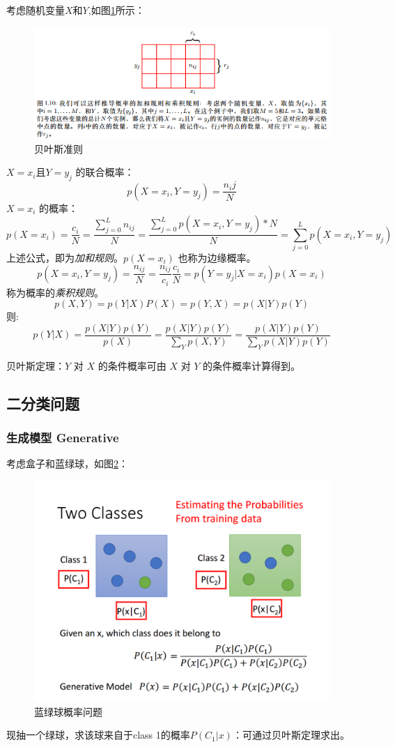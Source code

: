 考虑随机变量$X$和$Y$,如图\ref{fig:Bayesian lawl}所示：
\begin{figure}[ht]
	\centering
	\includegraphics[scale=0.5]{pic/gailv}
	\caption{贝叶斯准则}
	\label{fig:Bayesian lawl}
\end{figure}
$X=x_i$且$Y=y_j$ 的联合概率：
\[
p(X=x_i,Y=y_j)=\frac{n_ij}{N}
\]
$X=x_i$ 的概率：
\[
p(X=x_i)=\frac{c_i}{N}=\frac{\sum_{j=0}^L n_{ij}}{N}=\frac{\sum_{j=0}^L p(X=x_i,Y=y_j)*N}{N}=\sum_{j=0}^L p(X=x_i,Y=y_j)
\]
上述公式，即为\emph{加和规则}。$p(X=x_i)$ 也称为边缘概率。
\[
p(X=x_i,Y=y_j)=\frac{n_{ij}}{N}=\frac{n_{ij}}{c_i} \frac{c_i}{N}=p(Y=y_j|X=x_i)p(X=x_i)
\]
称为概率的\emph{乘积规则}。
\[
p(X,Y)=p(Y|X)P(X)=p(Y,X)=p(X|Y)p(Y)
\]
则:
\begin{equation}
p(Y|X)=\frac{p(X|Y)p(Y)}{p(X)}=\frac{p(X|Y)p(Y)}{\sum_Y{p(X,Y)}}=\frac{p(X|Y)p(Y)}{\sum_Y{p(X|Y)p(Y)}}
\end{equation}

贝叶斯定理：$Y$ 对 $X$ 的条件概率可由 $X$ 对 $Y$ 的条件概率计算得到。

\subsection{二分类问题}

\subsubsection{生成模型 Generative}

考虑盒子和蓝绿球，如图\ref{fig:green_blue_ball}：
\begin{figure}[ht]
	\centering
	\includegraphics[scale=0.4]{pic/classification_01}
	\caption{蓝绿球概率问题}
	\label{fig:green_blue_ball}
\end{figure}
现抽一个绿球，求该球来自于class 1的概率$P(C_1|x)$：可通过贝叶斯定理求出。


